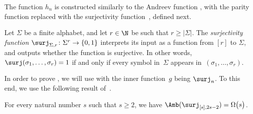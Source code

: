 \documentclass{toc}
\begin{document}
The function $h_{n}$ is constructed similarly to the Andreev function
\cite{A87}, with the parity function replaced with the surjectivity
function~\cite{BM12}, defined next.
\begin{definition}
\label{def:surjectivity}Let $\Sigma$ be a finite alphabet, and let $r\in\N$
be such that $r\ge\left|\Sigma\right|$. The \emph{surjectivity function}
$\surj_{\Sigma,r}\colon\Sigma^{r}\to\{0,1\}$ interprets its input
as a function from $\left[r\right]$ to $\Sigma$, and outputs whether
the function is surjective. In other words, $\surj(\sigma_{1},\ldots,\sigma_{r})=1$
if and only if every symbol in~$\Sigma$ appears in~$(\sigma_{1},\ldots,\sigma_{r})$.
\end{definition}

In order to prove , we will use 
with the inner function~$g$ being $\surj_{n}$. To this end, we
use the following result of~\cite{BM12}.
\begin{lemma}[\cite{BM12}]
\label{lemma:surj-amb}For every natural number $s$ such that $s\ge2$,
we have $\Amb(\surj_{\left[s\right],2s-2})=\Omega\bigl(s\bigr)$. 
\end{lemma}
\end{document}
